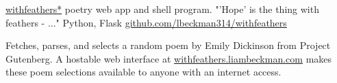 \showoff
{\textcolor{my-blue}{\href{https://withfeathers.liambeckman.com}{withfeathers*}}}
{poetry web app and shell program. "'Hope' is the thing with feathers - ..."}
{Python, Flask}
{\textcolor{my-blue}{\href{https://github.com/lbeckman314/withfeathers}{github.com/lbeckman314/withfeathers}}}

Fetches, parses, and selects a random poem by Emily Dickinson from Project Gutenberg. A hostable web interface at \textcolor{my-blue}{\href{https://withfeathers.liambeckman.com}{withfeathers.liambeckman.com}} makes these poem selections available to anyone with an internet access.

\myBreak
